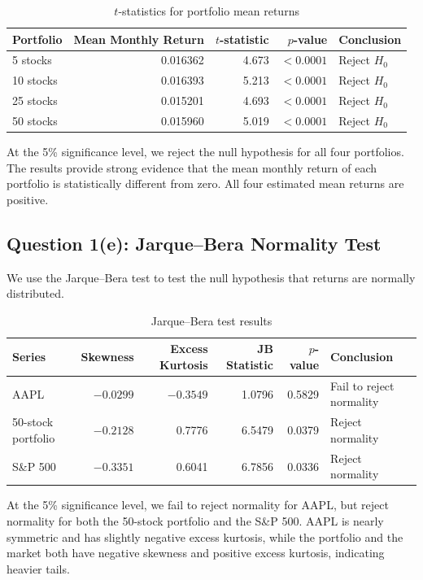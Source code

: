 \documentclass[11pt]{article}
\begin{document}
\begin{table}[H]
\centering
\caption{$t$-statistics for portfolio mean returns}
\begin{tabular}{lrrrl}
\toprule
Portfolio & Mean Monthly Return & $t$-statistic & $p$-value & Conclusion \\
\midrule
5 stocks  & 0.016362 & 4.673 & $<0.0001$ & Reject $H_0$ \\
10 stocks & 0.016393 & 5.213 & $<0.0001$ & Reject $H_0$ \\
25 stocks & 0.015201 & 4.693 & $<0.0001$ & Reject $H_0$ \\
50 stocks & 0.015960 & 5.019 & $<0.0001$ & Reject $H_0$ \\
\bottomrule
\end{tabular}
\end{table}

At the 5\% significance level, we reject the null hypothesis for all four portfolios. The results provide strong evidence that the mean monthly return of each portfolio is statistically different from zero. All four estimated mean returns are positive.

\subsection{Question 1(e): Jarque--Bera Normality Test}

We use the Jarque--Bera test to test the null hypothesis that returns are normally distributed.

\begin{table}[H]
\centering
\caption{Jarque--Bera test results}
\begin{tabular}{lrrrrl}
\toprule
Series & Skewness & Excess Kurtosis & JB Statistic & $p$-value & Conclusion \\
\midrule
AAPL & $-0.0299$ & $-0.3549$ & 1.0796 & 0.5829 & Fail to reject normality \\
50-stock portfolio & $-0.2128$ & 0.7776 & 6.5479 & 0.0379 & Reject normality \\
S\&P 500 & $-0.3351$ & 0.6041 & 6.7856 & 0.0336 & Reject normality \\
\bottomrule
\end{tabular}
\end{table}

At the 5\% significance level, we fail to reject normality for AAPL, but reject normality for both the 50-stock portfolio and the S\&P 500. AAPL is nearly symmetric and has slightly negative excess kurtosis, while the portfolio and the market both have negative skewness and positive excess kurtosis, indicating heavier tails.
\end{document}
